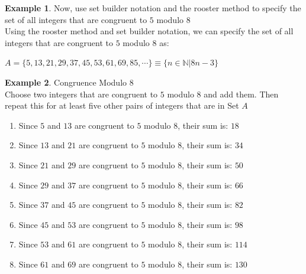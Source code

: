\documentclass{book}
\theoremstyle{definition}
\newtheorem{example}{Example}[definition]
\theoremstyle{remark}
\newcommand{\bb}[1]{\mathbb{#1}}
\begin{document}
\begin{example}
Now, use set builder notation and the rooster method to specify the set of all integers that are congruent to $5$ modulo $8$ \\

Using the rooster method and set builder notation, we can specify the set of all integers that are congruent to $5$ modulo $8$ as: \\
	\begin{center}
		$A = \{ 5, 13, 21, 29, 37, 45, 53, 61, 69, 85, \cdots \} \equiv \{n \in \bb{N}| 8n - 3  \}$
	\end{center}

\end{example}


\begin{example}
Congruence Modulo 8 \cite[Chap.3, P.C.3.4, Q.3]{ted} \\

Choose two integers that are congruent to $5$ modulo $8$ and add them. Then repeat this for at least  five other pairs of integers that are in Set $A$ \\

\begin{enumerate}
    \item Since $5$ and $13$ are congruent to $5$ modulo $8$, their sum is: $18$
    \item Since $13$ and $21$ are congruent to $5$ modulo $8$, their sum is: $34$
    \item Since $21$ and $29$ are congruent to $5$ modulo $8$, their sum is: $50$
    \item Since $29$ and $37$ are congruent to $5$ modulo $8$, their sum is: $66$
    \item Since $37$ and $45$ are congruent to $5$ modulo $8$, their sum is: $82$
    \item Since $45$ and $53$ are congruent to $5$ modulo $8$, their sum is: $98$
    \item Since $53$ and $61$ are congruent to $5$ modulo $8$, their sum is: $114$
    \item Since $61$ and $69$ are congruent to $5$ modulo $8$, their sum is: $130$
\end{enumerate}
\end{example}
\end{document}
